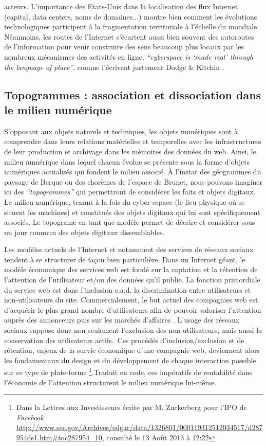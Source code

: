 acteurs. L’importance des Etats-Unis \citep{Zook2001, Cukier1999} dans la localisation des flux Internet (capital, data centers, noms de domaines...) montre bien comment les évolutions technologiques participent à la fragmentation territoriale à l’échelle du mondiale. Néanmoins, les routes de l’Internet s’écartent aussi bien souvent des autoroutes de l’information pour venir construire des sens beaucoup plus locaux par les nombreux mécanismes des activités en ligne. \textit{“cyberspace is ‘made real’ through the language of place”}, comme l’écrivent justement Dodge \& Kitchin \citep{Dodge2007}.

\subsection[Topogrammes : association et dissociation dans le milieu numérique]{Topogrammes : association et dissociation dans le milieu numérique}

S’opposant aux objets naturels et techniques, les objets numériques sont à comprendre dans leurs relations matérielles et temporelles avec les infrastructures de leur production et archivage dans les mémoires des données du web. Ainsi, le milieu numérique dans lequel chacun évolue se présente sous la forme d’objets numériques actualisés qui fondent le milieu associé. À l’instar des géogrammes du paysage de Berque ou des chorèmes de l’espace de Brunet, nous pouvons imaginer ici des \textit{“topogrammes”} qui permettront de considérer les faits et objets digitaux. Le milieu numérique, tenant à la fois du cyber-espace (le lieu physique où se situent les machines) et constitués des objets digitaux qui lui sont spécifiquement associés. Le topograme en tant que modèle permet de décrire et considérer sous un jour commun des objets digitaux dissemblables.

Les modèles actuels de l’Internet et notamment des services de réseaux sociaux tendent à se structurer de façon bien particulière. Dans un Internet géant, le modèle économique des services web est fondé sur la captation et la rétention de l'attention de l'utilisateur et/ou des données qu'il publie. La fonction primordiale du service web est donc l'inclusion c.a.d. la discrimination entre utilisateurs et non-utilisateurs du site. Commercialement, le but actuel des compagnies web est d'acquérir le plus grand nombre d'utilisateurs afin de pouvoir valoriser l’attention auprès des annonceurs puis sur les marchés d’affaires \cite{Ries2011}. L'usage des réseaux sociaux suppose donc non seulement l'exclusion des non-utilisateurs, mais aussi la conservation des utilisateurs actifs. Ces procédés d'inclusion/exclusion et de rétention, enjeux de la survie économique d'une compagnie web, deviennent alors les fondamentaux du design et du développement de chaque interaction possible sur ce type de plate-forme
\footnote{Dans la Lettres aux Investisseurs écrite par M. Zuckerberg  pour l’IPO de \textit{Facebook} \url{http://www.sec.gov/Archives/edgar/data/1326801/000119312512034517/d287954ds1.htm\#toc287954_10}, consulté le 13 Août 2013 à 12:22}.Traduit en code, ces impératifs de rentabilité dans l’économie de l’attention structurent le milieu numérique lui-même.

